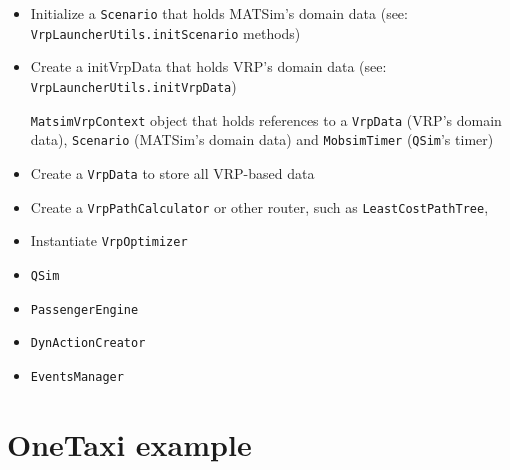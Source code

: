 \begin{itemize}
	\item Initialize a \lstinline$Scenario$ that holds MATSim's domain data (see: \lstinline$VrpLauncherUtils.initScenario$ methods)
	
	\item Create a \lstinline$$initVrpData that holds VRP's domain data (see: \lstinline$VrpLauncherUtils.initVrpData$)
	
	\lstinline$MatsimVrpContext$ object that holds references to a \lstinline$VrpData$ (VRP's domain data), \lstinline$Scenario$ (MATSim's domain data) and \lstinline$MobsimTimer$ (\lstinline$QSim$'s timer)
	
	\item Create a \lstinline$VrpData$ to store all VRP-based data 
	
	\item Create a \lstinline$VrpPathCalculator$ or other router, such as \lstinline$LeastCostPathTree$, 
	
	\item Instantiate \lstinline$VrpOptimizer$
	
	\item \lstinline$QSim$
	
	\item \lstinline$PassengerEngine$
	
	\item \lstinline$DynActionCreator$
	
	\item \lstinline$EventsManager$
	
\end{itemize}


\section{OneTaxi example}

